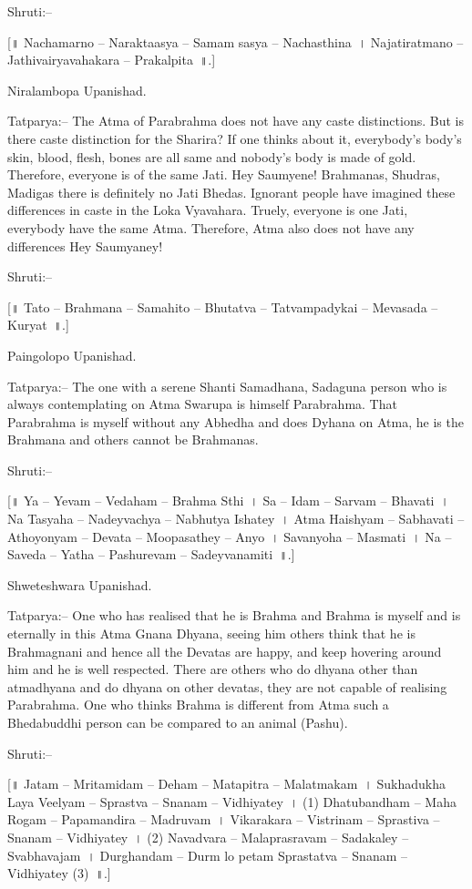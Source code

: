 Shruti:–

[॥ Nachamarno – Naraktaasya – Samam sasya – Nachasthina~। Najatiratmano – Jathivairyavahakara – Prakalpita~॥.]

Niralambopa Upanishad.

Tatparya:– The Atma of Parabrahma does not have any caste distinctions. But is there caste distinction for the Sharira? If one thinks about it, everybody's body's skin, blood, flesh, bones are all same and nobody's body is made of gold. Therefore, everyone is of the same Jati. Hey Saumyene! Brahmanas, Shudras, Madigas there is definitely no Jati Bhedas. Ignorant people have imagined these differences in caste in the Loka Vyavahara. Truely, everyone is one Jati, everybody have the same Atma. Therefore, Atma also does not have any differences Hey Saumyaney!

Shruti:–

[॥ Tato – Brahmana – Samahito – Bhutatva – Tatvampadykai – Mevasada – Kuryat~॥.]

Paingolopo Upanishad.

Tatparya:– The one with a serene Shanti Samadhana, Sadaguna person who is always contemplating on Atma Swarupa is himself Parabrahma. That Parabrahma is myself without any Abhedha and does Dyhana on Atma, he is the Brahmana and others cannot be Brahmanas.

Shruti:–

[॥ Ya – Yevam – Vedaham – Brahma Sthi~। Sa – Idam – Sarvam – Bhavati~। Na Tasyaha – Nadeyvachya – Nabhutya Ishatey~। Atma Haishyam – Sabhavati – Athoyonyam – Devata – Moopasathey – Anyo~। Savanyoha – Masmati~। Na – Saveda – Yatha – Pashurevam – Sadeyvanamiti~॥.]

Shweteshwara Upanishad.

Tatparya:– One who has realised that he is Brahma and Brahma is myself and is eternally in this Atma Gnana Dhyana, seeing him others think that he is Brahmagnani and hence all the Devatas are happy, and keep hovering around him and he is well respected. There are others who do dhyana other than atmadhyana and do dhyana on other devatas, they are not capable of realising Parabrahma. One who thinks Brahma is different from Atma such a Bhedabuddhi person can be compared to an animal (Pashu).

Shruti:–

[॥ Jatam – Mritamidam – Deham – Matapitra – Malatmakam~। Sukhadukha Laya Veelyam – Sprastva – Snanam – Vidhiyatey~। (1) Dhatubandham – Maha Rogam – Papamandira – Madruvam~। Vikarakara – Vistrinam – Sprastiva – Snanam – Vidhiyatey~। (2) Navadvara – Malaprasravam – Sadakaley – Svabhavajam~। Durghandam – Durm lo petam Sprastatva – Snanam – Vidhiyatey (3)~॥.]

